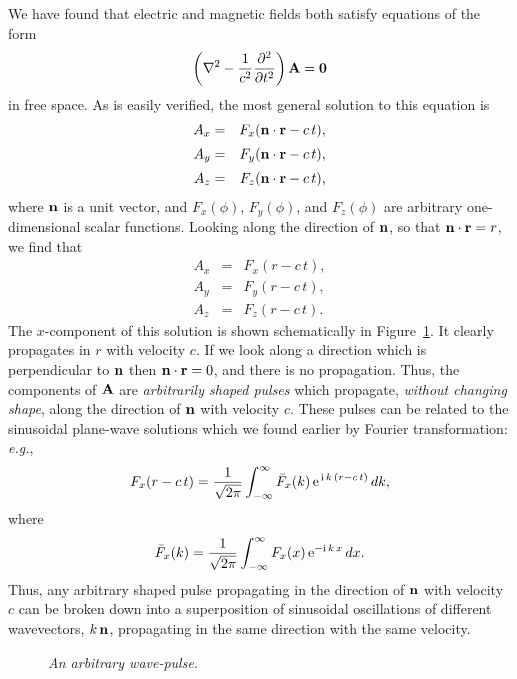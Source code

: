 We have found that  electric and magnetic fields both satisfy equations of the
form
\begin{equation}
\left( \nabla^2 - \frac{1}{c^2} \frac{\partial^2}{\partial t^2}\right) {\bf A} = {\bf 0}
\end{equation}
in free space. As is easily verified, the
 most general solution to this equation is
\begin{eqnarray}
 A_x& = & F_x ({\bf n}\cdot{\bf r} -c\,t),\\[0.5ex]
 A_y& = & F_y ({\bf n}\cdot{\bf r} - c\,t),\\[0.5ex]
 A_z& = & F_z ({\bf n}\cdot{\bf r} - c\,t),
\end{eqnarray}
where ${\bf n}$ is a unit vector, and $F_x(\phi)$, $F_y(\phi)$, and $F_z(\phi)$ are arbitrary
 one-dimensional
scalar functions. Looking along the direction of ${\bf n}$, so that ${\bf n}\cdot {\bf r} = r$,
we find that
\begin{eqnarray}
 A_x& = & F_x (r-c\,t),\\[0.5ex]
 A_y& = & F_y (r-c\,t),\\[0.5ex]
 A_z& = & F_z (r-c\,t).
\end{eqnarray}
The $x$-component of this solution is shown schematically in Figure~\ref{f35}. It clearly propagates in $r$
with velocity $c$. 
If we look along a direction which is perpendicular to ${\bf n}$ then
${\bf n}\cdot{\bf r} = 0$, and there is no propagation.
Thus,  the components
of ${\bf A}$ 
are  {\em arbitrarily shaped pulses}\/ which propagate, {\em without changing shape}, along
 the direction of ${\bf n}$
with velocity $c$. 
These pulses can be related to the sinusoidal plane-wave solutions which we found earlier
by Fourier transformation: {\em e.g.},
\begin{equation}
F_x(r-c\,t) = \frac{1}{\sqrt{2\pi}}\int_{-\infty}^{\infty} \bar{F}_x(k)\,{\rm e}^{\,{\rm i}\,k\,(r-c\,t)}\,dk,
\end{equation}
where 
\begin{equation}
\bar{F}_x(k) = \frac{1}{\sqrt{2\pi}}\int_{-\infty}^{\infty} F_x(x)\,{\rm e}^{-{\rm i}\,k\,x}\,dx.
\end{equation}
 Thus, any arbitrary shaped pulse propagating in the direction of
${\bf n}$ with velocity $c$ can be broken down into a superposition of sinusoidal oscillations of different wavevectors, $k\,{\bf n}$, propagating
in the same direction with the same velocity.
\begin{figure}
\centerline{}
\caption{\em An arbitrary wave-pulse.}\label{f35}
\end{figure}

